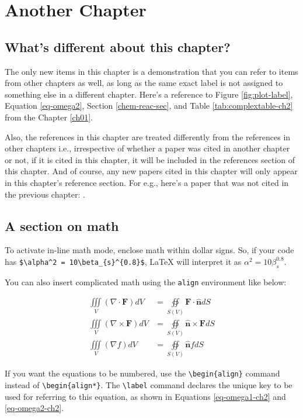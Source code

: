 \chapter{Another Chapter}\label{ch02}
\section{What's different about this chapter?}
The only new items in this chapter is a demonstration that you can refer to items from other chapters as well, as long as the same exact label is not assigned to something else in a different chapter. Here's a reference to Figure \ref{fig:plot-label}, Equation \ref{eq-omega2}, Section \ref{chem-reac-sec}, and Table \ref{tab:complextable-ch2} from the Chapter \ref{ch01}.

Also, the references in this chapter are treated differently from the references in other chapters i.e., irrespective of whether a paper was cited in another chapter or not, if it is cited in this chapter, it will be included in the references section of this chapter. And of course, any new papers cited in this chapter will only appear in this chapter's reference section. For e.g., here's a paper that was not cited in the previous chapter: \citep{Robinson2018}.

\section{A section on math}\label{math-sec-ch2}
To activate in-line math mode, enclose math within dollar signs. So, if your code has \verb|$\alpha^2 = 10\beta_{s}^{0.8}$|, \LaTeX{} will interpret it as $\alpha^2 = 10\beta_{s}^{0.8}$.

You can also insert complicated math using the \verb|align| environment like below:

\begin{align*}
  \iiint\limits_V(\nabla \cdot \mathbf{F}) dV
      & = \oiint \limits_{S(V)} \mathbf{F \cdot \hat{n}} dS \\
  \iiint\limits_V(\nabla \times \mathbf{F}) dV
      & = \oiint \limits_{S(V)} \mathbf{\hat{n} \times F} dS \\
  \iiint\limits_V(\nabla f) dV
      & = \oiint\limits_{S(V)}\mathbf{\hat{n}}f dS
\end{align*}

If you want the equations to be numbered, use the \verb|\begin{align}| command instead of \verb|\begin{align*}|. The \verb|\label| command declares the unique key to be used for referring to this equation, as shown in Equations \ref{eq-omega1-ch2} and \ref{eq-omega2-ch2}.

